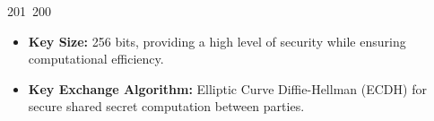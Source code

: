 201~200~\documentclass{article}
\begin{document}
\begin{itemize}
	                                                                                                                                                                                                                                                                                                	                                                                                                                                        	    	                                                                                                	                                                                                                                                                                                                                                                                                                                                	                                                                        	                                                                        	                                                                                                                                        	                                                                                                                                                        \item \textbf{Key Size:} 256 bits, providing a high level of security while ensuring computational efficiency.
	                                                                                                                                                                                                                                                                                                	                                                                                                                                        	    	                                                                                                	                                                                                                                                                                                                                                                                                                                                	                                                                        	                                                                        	                                                                                                                                        	                                                                                                                                                            \item \textbf{Key Exchange Algorithm:} Elliptic Curve Diffie-Hellman (ECDH) for secure shared secret computation between parties.

\end{itemize}
\end{document}
